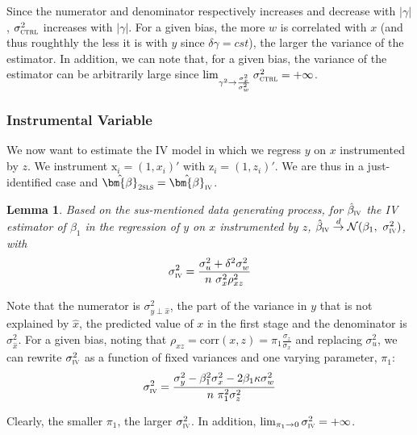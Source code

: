 \documentclass[usletter, 12pt]{article}
\newtheorem{lemma}{Lemma}
\begin{document}
				Since the numerator and denominator respectively increases and decrease with $|\gamma|$,  $\sigma_{\textsc{ctrl}}^{2}$ increases with $|\gamma|$. For a given bias, the more $w$ is correlated with $x$ (and thus roughthly the less it is with $y$ since $\delta \gamma = cst$), the larger the variance of the estimator. In addition, we can note that, for a given bias, the variance of the estimator can be arbitrarily large since $\lim_{\gamma^{2} \to \frac{\sigma_{x}^{2}}{\sigma_{w}^{2}}} \sigma_{\textsc{ctrl}}^{2} = + \infty$.
				
			
		
		\subsubsection{Instrumental Variable}
		
			We now want to estimate the IV model in which we regress $y$ on $x$ instrumented by $z$. We instrument $\text{x}_{i} = (1, x_{i})'$ with $\text{z}_{i} = (1, z_{i})'$. We are thus in a just-identified case and $\hat{\bm{\beta}}_{\textsc{2sls}} = \hat{\bm{\beta}}_{\textsc{iv}}$.						
			\begin{lemma}\label{lemma_iv}
				Based on the sus-mentioned data generating process, for $\hat{\beta}_{\textsc{iv}}$ the IV estimator of $\beta_{1}$ in the regression of $y$ on $x$ instrumented by $z$,  $\hat{\beta}_{\textsc{iv}} \overset{d}{\to} \mathcal{N}(\beta_{1}, \ \sigma_{\textsc{iv}}^{2})$, with
					\[
						\sigma_{\textsc{iv}}^{2} = \dfrac{\sigma_{u}^{2} + \delta^{2}\sigma_{w}^{2}}{n \ \sigma_{x}^{2} \rho_{xz}^{2}}
					\]
			\end{lemma}
			
			Note that the numerator is $\sigma_{y \perp \hat{x}}^{2}$, the part of the variance in $y$ that is not explained by $\hat{x}$, the predicted value of $x$ in the first stage and the denominator is $\sigma_{\hat{x}}^{2}$. For a given bias, noting that $\rho_{xz} = \text{corr}(x, z) = \pi_1 \frac{\sigma_z}{\sigma_x}$ and replacing $\sigma_{u}^{2}$, we can rewrite $\sigma_{\textsc{iv}}^{2}$ as a function of fixed variances and one varying parameter, $\pi_{1}$:
			\[
				\sigma_{\textsc{iv}}^{2} = \dfrac{\sigma_{y}^{2} - \beta_{1}^{2}\sigma_{x}^{2} - 2\beta_{1}\kappa \sigma_{w}^{2}}{n \ \pi_{1}^{2} \sigma_{z}^{2}}
			\]
			
			Clearly, the smaller $\pi_{1}$, the larger $\sigma_{\textsc{iv}}^{2}$. In addition, $\lim_{\pi_{1}\to 0} \sigma_{\textsc{iv}}^{2} = + \infty$.
			
\end{document}
